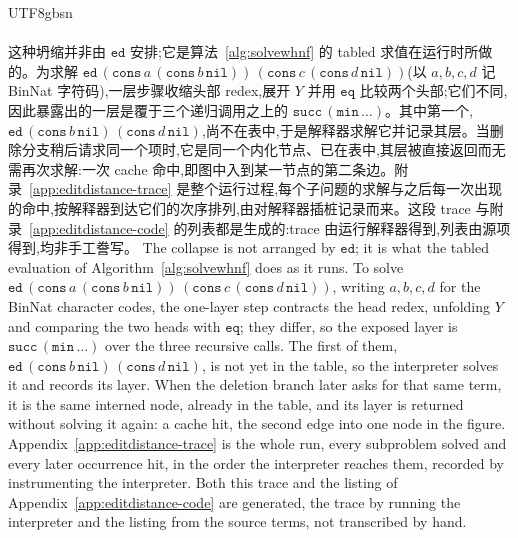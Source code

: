 \begin{CJK*}{UTF8}{gbsn}
  \paragraph{}
  \ifTablambdaChinese
  这种坍缩并非由 $\mathtt{ed}$ 安排;它是算法~\ref{alg:solvewhnf} 的 tabled 求值在运行时所做的。为求解 $\mathtt{ed}\,(\mathtt{cons}\,a\,(\mathtt{cons}\,b\,\mathtt{nil}))\,(\mathtt{cons}\,c\,(\mathtt{cons}\,d\,\mathtt{nil}))$(以 $a,b,c,d$ 记 BinNat 字符码),一层步骤收缩头部 redex,展开 $Y$ 并用 $\mathtt{eq}$ 比较两个头部;它们不同,因此暴露出的一层是覆于三个递归调用之上的 $\mathtt{succ}\,(\mathtt{min}\,\dots)$。其中第一个,$\mathtt{ed}\,(\mathtt{cons}\,b\,\mathtt{nil})\,(\mathtt{cons}\,d\,\mathtt{nil})$,尚不在表中,于是解释器求解它并记录其层。当删除分支稍后请求同一个项时,它是同一个内化节点、已在表中,其层被直接返回而无需再次求解:一次 cache 命中,即图中入到某一节点的第二条边。附录~\ref{app:editdistance-trace} 是整个运行过程,每个子问题的求解与之后每一次出现的命中,按解释器到达它们的次序排列,由对解释器插桩记录而来。这段 trace 与附录~\ref{app:editdistance-code} 的列表都是生成的:trace 由运行解释器得到,列表由源项得到,均非手工誊写。
  \else
  The collapse is not arranged by $\mathtt{ed}$; it is what the tabled evaluation of Algorithm~\ref{alg:solvewhnf} does as it runs. To solve $\mathtt{ed}\,(\mathtt{cons}\,a\,(\mathtt{cons}\,b\,\mathtt{nil}))\,(\mathtt{cons}\,c\,(\mathtt{cons}\,d\,\mathtt{nil}))$, writing $a,b,c,d$ for the BinNat character codes, the one-layer step contracts the head redex, unfolding $Y$ and comparing the two heads with $\mathtt{eq}$; they differ, so the exposed layer is $\mathtt{succ}\,(\mathtt{min}\,\dots)$ over the three recursive calls. The first of them, $\mathtt{ed}\,(\mathtt{cons}\,b\,\mathtt{nil})\,(\mathtt{cons}\,d\,\mathtt{nil})$, is not yet in the table, so the interpreter solves it and records its layer. When the deletion branch later asks for that same term, it is the same interned node, already in the table, and its layer is returned without solving it again: a cache hit, the second edge into one node in the figure. Appendix~\ref{app:editdistance-trace} is the whole run, every subproblem solved and every later occurrence hit, in the order the interpreter reaches them, recorded by instrumenting the interpreter. Both this trace and the listing of Appendix~\ref{app:editdistance-code} are generated, the trace by running the interpreter and the listing from the source terms, not transcribed by hand.
  \fi


\end{CJK*}
